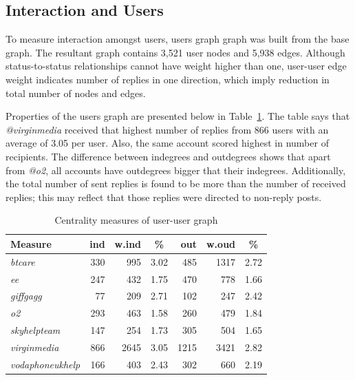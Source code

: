 \documentclass[sigconf]{acmart}
\begin{document}
{\subsection{Interaction and Users}


To measure interaction amongst users, users graph graph was built 
from the base graph. The resultant graph contains 3,521 user nodes 
and 5,938 edges. %
Although status-to-status relationships cannot
have weight higher than one, user-user edge weight indicates number of
replies in one direction, which imply reduction in total number of
nodes and edges.


Properties of the users graph are presented below in Table~\ref{tbl:uucentralitymeasures}. 
The table says that {\emph{@virginmedia}} received that highest number of
replies from 866 users with an average of 3.05 per user. Also, the
same account scored highest in number of recipients. The difference
between indegrees and outdegrees shows that apart from {\emph{@o2}},
all accounts have outdegrees bigger that their
indegrees. Additionally, the total number of sent replies is found to
be more than the number of received replies; this may reflect that
those replies were directed to non-reply posts.

\begin{table}[!h]
\centering
\begin{tabularx}{\columnwidth}{l|rrc|rrc}
\toprule
\textbf{Measure} & \textbf{ind} & \textbf{w.ind} & \textbf{\%} & \textbf{out} & \textbf{w.oud} & \textbf{\%}\\ 
\midrule
{\emph{btcare}} & 330 & 995 & 3.02 & 485 & 1317 & 2.72\\
{\emph{ee}} & 247 & 432 & 1.75 & 470 & 778 & 1.66 \\
{\emph{giffgagg}} & 77 & 209 & 2.71 & 102 & 247 & 2.42 \\ 
{\emph{o2}} & 293 & 463 & 1.58 & 260 & 479 & 1.84 \\
{\emph{skyhelpteam}} & 147 & 254 & 1.73 & 305 & 504 & 1.65\\
{\emph{virginmedia}} & 866 & 2645 & 3.05 & 1215 & 3421 & 2.82\\
{\emph{vodaphoneukhelp}} & 166 & 403 & 2.43 & 302 & 660 & 2.19\\
\bottomrule
\end{tabularx}
\caption{Centrality measures of user-user graph}
\label{tbl:uucentralitymeasures}
\end{table}


}
\end{document}

